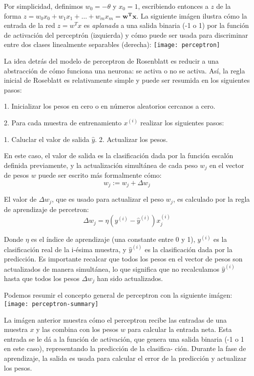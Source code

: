 Por simplicidad, definimos $w_0=-\theta$ y $x_0=1$, escribiendo entonces a $z$ de la
forma $z=w_0x_0 + w_1x_1 + \dots + w_mx_m = \mathbf{w^Tx}$.
La siguiente imágen ilustra cómo la entrada de la red $z=w^Tx$ es \textit{aplanada}
a una salida binaria (-1 o 1) por la función de activación del perceptrón (izquierda)
y cómo puede ser usada para discriminar entre dos clases linealmente separables (derecha):
\texttt{[image: perceptron]}\cite{python}

La idea detrás del modelo de perceptron de Rosenblatt es reducir a una abstracción de cómo funciona
una neurona: se activa o no se activa. Así, la regla inicial de Roseblatt es relativamente
simple y puede ser resumida en los siguientes pasos:

1. Inicializar los pesos en cero o en números aleatorios cercanos a cero.

2. Para cada muestra de entrenamiento $x^{(i)}$ realizar los siguientes pasos:

1. Caluclar el valor de salida $\hat y$.
2. Actualizar los pesos.


En este caso, el valor de salida es la clasificación dada por la función escalón
definida previamente, y la actualización simultánea de cada peso $w_j$ en el
vector de pesos $w$ puede ser escrito más formalmente cómo:
\begin{equation}
  w_j := w_j + \Delta w_j
\end{equation}

El valor de $\Delta w_j$, que es usado para actualizar el peso $w_j$, es
calculado por la regla de aprendizaje de percetron:
\begin{equation}
  \Delta w_j = \eta (y^{(i)} - \hat y^{(i)})x^{(i)}_j
\end{equation}

Donde $\eta$ es el índice de aprendizaje (una constante entre 0 y 1),
$y^{(i)}$ es la clasificación real de la i-ésima muestra, y $\hat y^{(i)}$
es la clasificación dada por la predicción. Es importante recalcar que
todos los pesos en el vector de pesos son actualizados de manera
simultánea, lo que significa que no recalculamos $\hat y^{(i)}$ hasta que
todos los pesos $\Delta w_j$ han sido actualizados.

Podemos resumir el concepto general de perceptron con la siguiente imágen:
\texttt{[image: perceptron-summary]}\cite{python}

La imágen anterior muestra cómo el perceptron recibe las entradas de una
muestra $x$ y las combina con los pesos $w$ para calcular la entrada neta.
Esta entrada se le dá a la función de activación, que genera una salida
binaria (-1 o 1 en este caso), representando la predicción de la clasifica-
ción. Durante la fase de aprendizaje, la salida es usada para calcular el
error de la predicción y actualizar los pesos.

